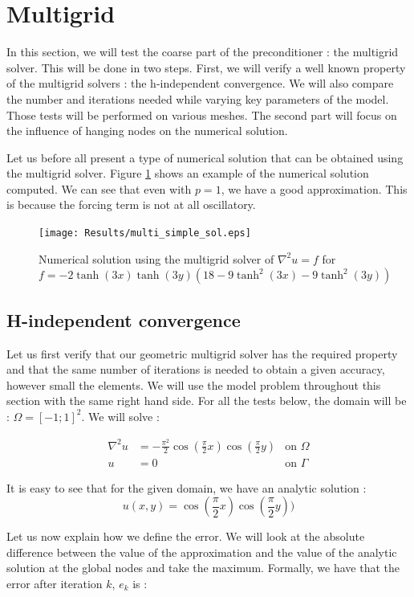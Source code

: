 \section{Multigrid}
In this section, we will test the coarse part of the preconditioner : the multigrid solver. This will be done in two steps. First, we will verify a well known property of the multigrid solvers : the h-independent convergence. We will also compare the number and iterations needed while varying key parameters of the model. Those tests will be performed on various meshes. The second part will focus on the influence of hanging nodes on the numerical solution. 

Let us before all present a type of numerical solution that can be obtained using the multigrid solver. Figure \ref{multi_simple_sol} shows an example of the numerical solution computed. We can see that even with $p=1$, we have a good approximation. This is because the forcing term is not at all oscillatory.

\begin{figure}
\centering
\texttt{[image: Results/multi\_simple\_sol.eps]}
\caption{Numerical solution using the multigrid solver of $\nabla^2 u = f$ for $f = -2\tanh(3x)\tanh(3y)(18-9\tanh^2(3x)-9\tanh^2(3y))$}
\label{multi_simple_sol}
\end{figure}

\subsection{H-independent convergence}
Let us first verify that our geometric multigrid solver has the required property and that the same number of iterations is needed to obtain a given accuracy, however small the elements. We will use the model problem throughout this section with the same right hand side. For all the tests below, the domain  will be : $\Omega = [-1;1]^2$. We will solve : 

\begin{align}
\nabla^2 u &= -\frac{\pi^2}{2}\cos(\frac{\pi}{2}x)\cos(\frac{\pi}{2}y) &\text{on $\Omega$} \label{eq:prob1} \\
u &= 0  &\text{on $\Gamma$}
\end{align}

It is easy to see that for the given domain, we have an analytic solution : 
$$u(x,y) = \cos(\frac{\pi}{2}x)\cos(\frac{\pi}{2}y))$$ 


Let us now explain how we define the error. We will look at the absolute difference between the value of the approximation and the value of the analytic solution at the global nodes and take the maximum. Formally, we have that the error after iteration $k$, $e_k$ is :

